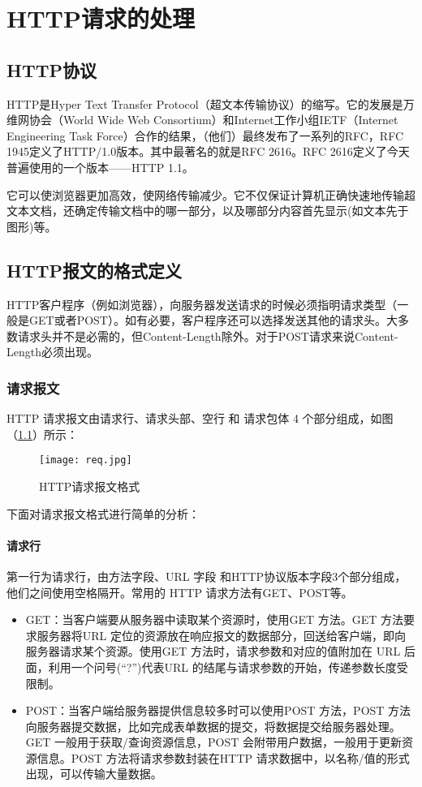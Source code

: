 \documentclass[bachelor]{thesis-uestc}
\begin{document}
\chapter{HTTP请求的处理}

\section{HTTP协议}

HTTP是Hyper Text Transfer Protocol（超文本传输协议）的缩写。它的发展是万维网协会（World Wide Web Consortium）和Internet工作小组IETF（Internet Engineering Task Force）合作的结果，（他们）最终发布了一系列的RFC，RFC 1945定义了HTTP/1.0版本。其中最著名的就是RFC 2616。RFC 2616定义了今天普遍使用的一个版本——HTTP 1.1。

它可以使浏览器更加高效，使网络传输减少。它不仅保证计算机正确快速地传输超文本文档，还确定传输文档中的哪一部分，以及哪部分内容首先显示(如文本先于图形)等。
\section{HTTP报文的格式定义}

HTTP客户程序（例如浏览器），向服务器发送请求的时候必须指明请求类型（一般是GET或者POST）。如有必要，客户程序还可以选择发送其他的请求头。大多数请求头并不是必需的，但Content-Length除外。对于POST请求来说Content-Length必须出现。 

\subsection{请求报文}
HTTP 请求报文由请求行、请求头部、空行 和 请求包体 4 个部分组成，如图（\ref{httpreq}）所示：
\begin{figure}[h]
\texttt{[image: req.jpg]}
\caption{HTTP请求报文格式}
\label{httpreq} 
\end{figure}

下面对请求报文格式进行简单的分析：

\subsubsection*{请求行}
第一行为请求行，由方法字段、URL 字段 和HTTP协议版本字段3个部分组成，他们之间使用空格隔开。常用的 HTTP 请求方法有GET、POST等。

\begin{itemize}
	\item GET：当客户端要从服务器中读取某个资源时，使用GET 方法。GET 方法要求服务器将URL 定位的资源放在响应报文的数据部分，回送给客户端，即向服务器请求某个资源。使用GET 方法时，请求参数和对应的值附加在 URL 后面，利用一个问号(“?”)代表URL 的结尾与请求参数的开始，传递参数长度受限制。
	\item POST：当客户端给服务器提供信息较多时可以使用POST 方法，POST 方法向服务器提交数据，比如完成表单数据的提交，将数据提交给服务器处理。GET 一般用于获取/查询资源信息，POST 会附带用户数据，一般用于更新资源信息。POST 方法将请求参数封装在HTTP 请求数据中，以名称/值的形式出现，可以传输大量数据。
\end{itemize}
\end{document}
